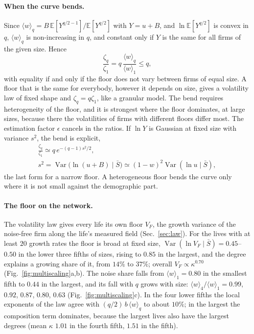 \documentclass[pre,twocolumn,superscriptaddress,nofootinbib]{revtex4-2}
\newcommand{\E}{\mathbb E}
\newcommand{\Var}{\operatorname{Var}}
\newcommand{\Sb}{\bar S}
\begin{document}
\paragraph{When the curve bends.}  Since $\langle w\rangle_q=B\,\E[Y^{q/2-1}]/\E[Y^{q/2}]$ with $Y=u+B$, and
$\ln\E[Y^{q/2}]$ is convex in $q$, $\langle w\rangle_q$ is non-increasing in $q$, and constant only if $Y$ is
the same for all firms of the given size.  Hence
\begin{equation}
\frac{\zeta_q}{\zeta_1}=q\,\frac{\langle w\rangle_q}{\langle w\rangle_1}\le q,
\label{eq:bend}
\end{equation}
with equality if and only if the floor does not vary between firms of equal size.  A floor that is
the same for everybody, however it depends on size, gives a volatility law of fixed shape and
$\zeta_q=q\zeta_1$, like a granular model.  The bend requires heterogeneity of the floor, and it is
strongest where the floor dominates, at large sizes, because there the volatilities of firms with
different floors differ most.  The estimation factor $\epsilon$ cancels in the ratios.  If $\ln Y$ is
Gaussian at fixed size with variance $s^2$, the bend is explicit,
\begin{gather}
\frac{\zeta_q}{\zeta_1}\simeq q\,e^{-(q-1)s^2/2},\nonumber\\
s^2=\Var\big(\ln(u+B)\mid\Sb\big)\simeq(1-w)^2\Var(\ln u\mid\Sb),
\label{eq:lognormal}
\end{gather}
the last form for a narrow floor.  A heterogeneous floor bends the curve only where it is not small
against the demographic part.

\paragraph{The floor on the network.}  The volatility law gives every life its own floor $V_F$, the
growth variance of the noise-free firm along the life's measured field (Sec.~\ref{sec:law}).  For the
lives with at least $20$ growth rates the floor is broad at fixed size, $\Var(\ln V_F\mid\Sb)=0.45$--$0.50$
in the lower three fifths of sizes, rising to $0.85$ in the largest, and the degree explains a growing
share of it, from $14\%$ to $37\%$; overall $V_F\propto\kappa^{0.70}$ (Fig.~\ref{fig:multiscaling}a,b).  The
noise share falls from $\langle w\rangle_1=0.80$ in the smallest fifth to $0.44$ in the largest, and its fall
with $q$ grows with size: $\langle w\rangle_4/\langle w\rangle_1=0.99$, $0.92$, $0.87$, $0.80$, $0.63$
(Fig.~\ref{fig:multiscaling}c).  In the four lower fifths the local exponents of the law agree with
$(q/2)\,b\,\langle w\rangle_q$ to about $10\%$; in the largest the composition term dominates, because the
largest lives also have the largest degrees (mean $\kappa$ $1.01$ in the fourth fifth, $1.51$ in the fifth).
\end{document}

